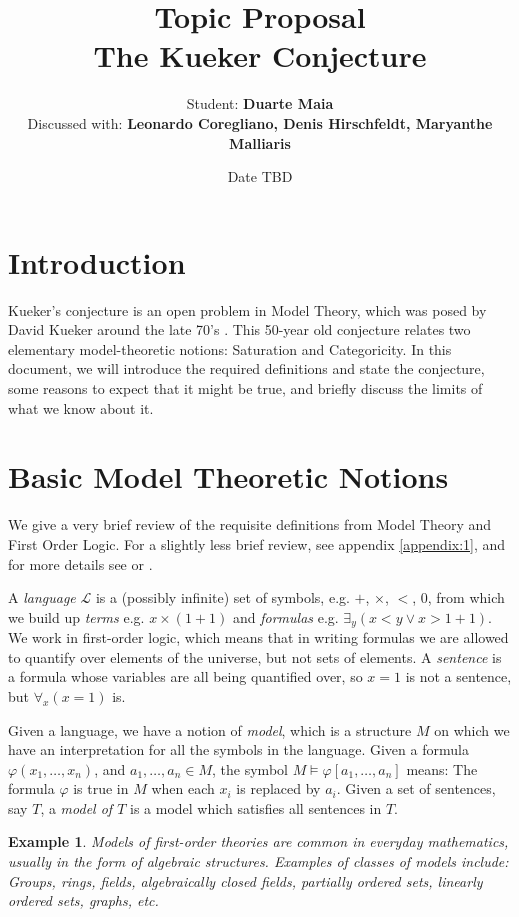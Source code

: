 \documentclass{article}
\title{Topic Proposal\\The Kueker Conjecture}
\author{Student: \textbf{Duarte Maia}\\[1ex]Discussed with: \textbf{Leonardo Coregliano, Denis Hirschfeldt, Maryanthe Malliaris}}
\date{Date TBD}
\newtheorem{example}[theorem]{Example}
\theoremstyle{nonumberplain}
\newcommand{\Lang}{\mathcal{L}}
\begin{document}
\maketitle

\tableofcontents

\section{Introduction}

Kueker's conjecture is an open problem in Model Theory, which was posed by David Kueker around the late 70's \cite{kuekersuperstable}. This 50-year old conjecture relates two elementary model-theoretic notions: Saturation and Categoricity. In this document, we will introduce the required definitions and state the conjecture, some reasons to expect that it might be true, and briefly discuss the limits of what we know about it.

\section{Basic Model Theoretic Notions}

We give a very brief review of the requisite definitions from Model Theory and First Order Logic. For a slightly less brief review, see appendix \ref{appendix:1}, and for more details see \cite{cnk} or \cite{shoenfield}.

A \emph{language} $\Lang$ is a (possibly infinite) set of symbols, e.g. $+$, $\times$, $<$, $0$, from which we build up \emph{terms} e.g. $x \times (1 + 1)$ and \emph{formulas} e.g. $\exists_y (x < y \lor x > 1+1)$. We work in first-order logic, which means that in writing formulas we are allowed to quantify over elements of the universe, but not sets of elements. A \emph{sentence} is a formula whose variables are all being quantified over, so $x=1$ is not a sentence, but $\forall_x (x=1)$ is.

Given a language, we have a notion of \emph{model}, which is a structure $M$ on which we have an interpretation for all the symbols in the language. Given a formula $\varphi(x_1, \dots, x_n)$, and $a_1, \dots, a_n \in M$, the symbol ${M \vDash \varphi[a_1, \dots, a_n]}$ means: The formula $\varphi$ is true in $M$ when each $x_i$ is replaced by $a_i$. Given a set of sentences, say $T$, a \emph{model of $T$} is a model which satisfies all sentences in $T$.

\begin{example}
Models of first-order theories are common in everyday mathematics, usually in the form of algebraic structures. Examples of classes of models include: Groups, rings, fields, algebraically closed fields, partially ordered sets, linearly ordered sets, graphs, etc.
\end{example}
\end{document}
